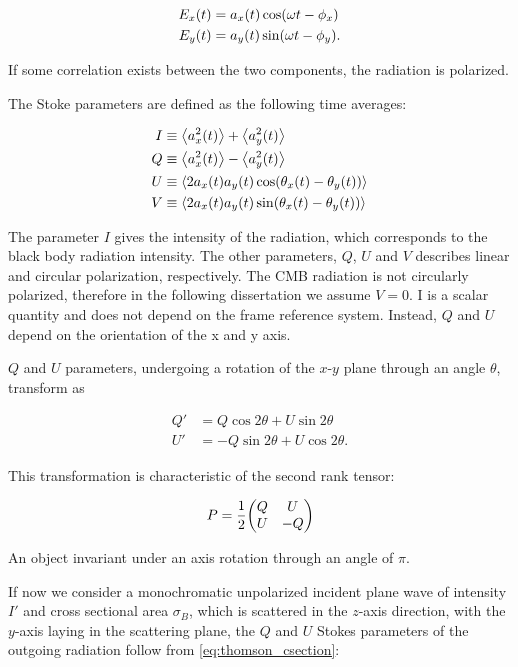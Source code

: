 \begin{align}
        E_x\qty(t) & = a_x\qty(t)\cos(\omega t - \phi_x) \\
        E_y\qty(t) & = a_y\qty(t)\sin(\omega t - \phi_y).
\end{align}

If some correlation exists between the two components, the radiation is
polarized.

The Stoke parameters are defined as the following time averages:

\begin{align}
        I & \equiv \expval{a^2_x\qty(t)} + \expval{a^2_y\qty(t)} \\
        Q & \equiv \expval{a^2_x\qty(t)} - \expval{a^2_y\qty(t)} \\
        U & \equiv \expval{2a_x\qty(t)a_y\qty(t)
        \cos(\theta_x\qty(t) - \theta_y\qty(t))} \\
        V & \equiv \expval{2a_x\qty(t)a_y\qty(t)
        \sin(\theta_x\qty(t) - \theta_y\qty(t))}
\end{align}

The parameter $I$ gives the intensity of the radiation, which corresponds
to the black body radiation intensity. The other parameters, $Q$, $U$ and
$V$ describes linear and circular polarization, respectively. The CMB
radiation is not circularly polarized, therefore in the following
dissertation we assume $V = 0$. I is a scalar quantity and does not depend
on the frame reference system. Instead, $Q$ and $U$ depend on the
orientation of the x and y axis.

$Q$ and $U$ parameters, undergoing a rotation of the $x$-$y$ plane through
an angle $\theta$, transform as

\begin{align}
        Q' & = Q\cos{2\theta} + U\sin{2\theta} \\
        U' & = -Q\sin{2\theta} + U\cos{2\theta}.
\end{align}

This transformation is characteristic of the second rank tensor:

\begin{equation}
        P = \frac{1}{2} \mqty(Q & U \\
                              U & -Q)
\end{equation}

An object invariant under an axis rotation through an angle of $\pi$.

If now we consider a monochromatic unpolarized incident plane wave of
intensity $I'$ and cross sectional area $\sigma_B$, which is scattered in
the $z$-axis direction, with the $y$-axis laying in the scattering plane,
the $Q$ and $U$ Stokes parameters of the outgoing radiation follow from
\autoref{eq:thomson_csection}:

